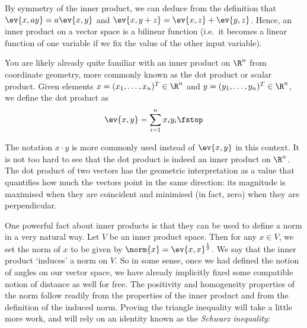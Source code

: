 By symmetry of the inner product, we can deduce from the definition that \( \ev{x,ay}=a\ev{x,y} \) and \( \ev{x,y+z}=\ev{x,z}+\ev{y,z} \). Hence, an inner product on a vector space is a bilinear function (i.e.\ it becomes a linear function of one variable if we fix the value of the other input variable).

\vspace{3mm}

You are likely already quite familiar with an inner product on \( \R^n \) from coordinate geometry, more commonly known as the dot product or scalar product. Given elements \( x=(x_1,\dots,x_n)^T\in\R^n \) and \( y=(y_1,\dots,y_n)^T\in\R^n \), we define the dot product as
\[ \ev{x,y}=\sum_{i=1}^nx_iy_i\fstop \]

The notation \( x\cdot y \) is more commonly used instead of \( \ev{x,y} \) in this context. It is not too hard to see that the dot product is indeed an inner product on \( \R^n \). The dot product of two vectors has the geometric interpretation as a value that quantifies how much the vectors point in the same direction: its magnitude is maximised when they are coincident and minimised (in fact, zero) when they are perpendicular.

\vspace{3mm}

One powerful fact about inner products is that they can be used to define a norm in a very natural way. Let \( V \) be an inner product space. Then for any \( x\in V \), we set the norm of \( x \) to be given by \( \norm{x}=\ev{x,x}^{\frac{1}{2}} \). We say that the inner product `induces' a norm on \( V \). So in some sense, once we had defined the notion of angles on our vector space, we have already implicitly fixed some compatible notion of distance as well for free. The positivity and homogeneity properties of the norm follow readily from the properties of the inner product and from the definition of the induced norm. Proving the triangle inequality will take a little more work, and will rely on an identity known as the \emph{Schwarz inequality}:


